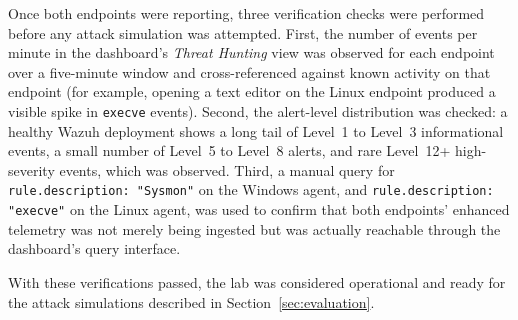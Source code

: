 Once both endpoints were reporting, three verification checks were performed
before any attack simulation was attempted. First, the number of events per
minute in the dashboard's \textit{Threat Hunting} view was observed for each
endpoint over a five-minute window and cross-referenced against known
activity on that endpoint (for example, opening a text editor on the Linux
endpoint produced a visible spike in \texttt{execve} events). Second, the
alert-level distribution was checked: a healthy Wazuh deployment shows a
long tail of Level~1 to Level~3 informational events, a small number of Level~5
to Level~8 alerts, and rare Level~12+ high-severity events, which was
observed. Third, a manual query for \texttt{rule.description: "Sysmon"} on
the Windows agent, and \texttt{rule.description: "execve"} on the Linux
agent, was used to confirm that both endpoints' enhanced telemetry was not
merely being ingested but was actually reachable through the dashboard's
query interface.

With these verifications passed, the lab was considered operational and
ready for the attack simulations described in Section~\ref{sec:evaluation}.
